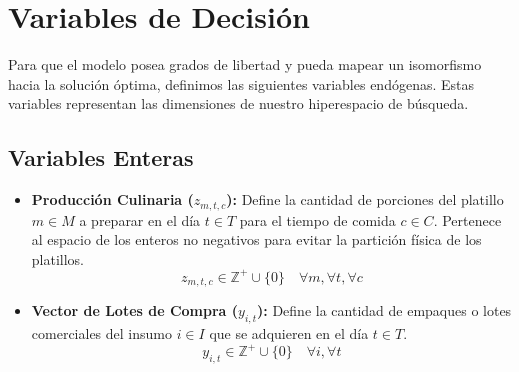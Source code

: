 \documentclass[12pt, a4paper]{article}
\begin{document}
\section{Variables de Decisión}

Para que el modelo posea grados de libertad y pueda mapear un isomorfismo hacia la solución óptima, definimos las siguientes variables endógenas. Estas variables representan las dimensiones de nuestro hiperespacio de búsqueda.

\subsection{Variables Enteras}
\begin{itemize}
    \item \textbf{Producción Culinaria ($z_{m,t,c}$):} Define la cantidad de porciones del platillo $m \in M$ a preparar en el día $t \in T$ para el tiempo de comida $c \in C$. Pertenece al espacio de los enteros no negativos para evitar la partición física de los platillos.
    \begin{equation}
        z_{m,t,c} \in \mathbb{Z}^{+} \cup \{0\} \quad \forall m, \forall t, \forall c
    \end{equation}

    \item \textbf{Vector de Lotes de Compra ($y_{i,t}$):} Define la cantidad de empaques o lotes comerciales del insumo $i \in I$ que se adquieren en el día $t \in T$.
    \begin{equation}
        y_{i,t} \in \mathbb{Z}^{+} \cup \{0\} \quad \forall i, \forall t
    \end{equation}
\end{itemize}
\end{document}
